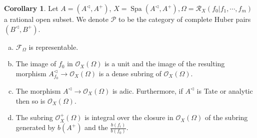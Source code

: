 \documentclass[10pt]{article}
\numberwithin{equation}{section}
\theoremstyle{definition}
\newtheorem{corollary}{Corollary} [subsection]
\DeclareMathOperator{\Spa}{Spa}
\newcommand{\cR}[0]{\mathcal{R}}
\newcommand{\cO}[0]{\mathcal{O}}
\newcommand{\cF}[0]{\mathcal{F}}
\begin{document}
\begin{corollary}
    \label{corollary_20_3}
    Let $A=(A^\triangleleft,A^+)$, $X=\Spa(A^\triangleleft,A^+),\Omega = \cR_X(f_0|f_1,\cdots,f_m)$ a rational open subset.
    We denote $\mathcal{P}$ to be the category of complete Huber pairs $(B^\triangleleft,B^+)$.
    \begin{enumerate}[a.]
        \item $\cF_\Omega$ is representable.
        \item The image of $f_0$ in $\cO_X(\Omega)$ is a unit and the image of the resulting morphism $A_{f_0}^\triangleleft\to\cO_X(\Omega)$ is a dense subring of $\cO_X(\Omega)$.
        \item The morphism $A^\triangleleft\to\cO_X(\Omega)$ is adic. Furthermore, if $A^\triangleleft$ is Tate or analytic then so is $\cO_X(\Omega)$.
        \item The subring $\cO_X^+(\Omega)$ is integral over the closure in $\cO_X(\Omega)$ of the subring generated by $b(A^+)$ and the ${\frac {b(f_i)} {b(f_0)}}$.
    \end{enumerate}
\end{corollary}
\end{document}
